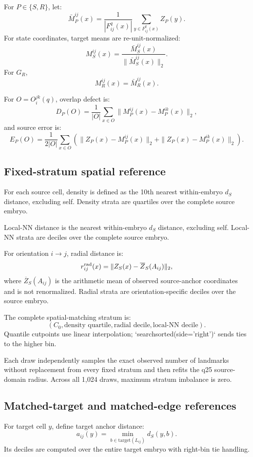 \documentclass[11pt]{article}
\newcommand{\Czero}{C_0}
\begin{document}
For \(P\in\{S,R\}\), let:
\[
\bar M_P^{ij}(x)
=
\frac1{|F_{ij}^q(x)|}
\sum_{y\in F_{ij}^q(x)}
Z_P(y).
\]
For state coordinates, target means are re-unit-normalized:
\[
M_S^{ij}(x)=
\frac{\bar M_S^{ij}(x)}
{\|\bar M_S^{ij}(x)\|_2}.
\]
For \(G_R\),
\[
M_R^{ij}(x)=\bar M_R^{ij}(x).
\]

For \(O=O_i^{jk}(q)\), overlap defect is:
\[
D_P(O)=
\frac1{|O|}
\sum_{x\in O}
\|
M_P^{ij}(x)-M_P^{ik}(x)
\|_2,
\]
and source error is:
\[
E_P(O)=
\frac1{2|O|}
\sum_{x\in O}
\left(
\|Z_P(x)-M_P^{ij}(x)\|_2+
\|Z_P(x)-M_P^{ik}(x)\|_2
\right).
\]

\subsection{Fixed-stratum spatial reference}

For each source cell, density is defined as the 10th nearest within-embryo \(d_S\) distance, excluding self. Density strata are quartiles over the complete source embryo.

Local-NN distance is the nearest within-embryo \(d_S\) distance, excluding self. Local-NN strata are deciles over the complete source embryo.

For orientation \(i\to j\), radial distance is:
\[
r^{\rm rad}_{ij}(x)
=
\|
Z_S(x)-\overline Z_S(A_{ij})
\|_2,
\]
where \(\overline Z_S(A_{ij})\) is the arithmetic mean of observed source-anchor coordinates and is not renormalized. Radial strata are orientation-specific deciles over the source embryo.

The complete spatial-matching stratum is:
\[
(\Czero,\text{density quartile},\text{radial decile},\text{local-NN decile}).
\]
Quantile cutpoints use linear interpolation; `searchsorted(side='right')` sends ties to the higher bin.

Each draw independently samples the exact observed number of landmarks without replacement from every fixed stratum and then refits the q25 source-domain radius. Across all 1,024 draws, maximum stratum imbalance is zero.

\subsection{Matched-target and matched-edge references}

For target cell \(y\), define target anchor distance:
\[
a_{ij}(y)
=
\min_{b\in \mathrm{target}(L_{ij})}
d_S(y,b).
\]
Its deciles are computed over the entire target embryo with right-bin tie handling.
\end{document}

